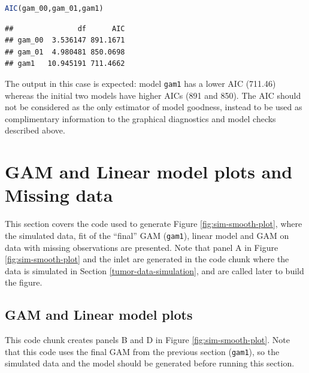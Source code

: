 \documentclass[
]{article}
\newcommand{\passthrough}[1]{#1}
\begin{document}
\begin{lstlisting}[language=R]
AIC(gam_00,gam_01,gam1)
\end{lstlisting}

\begin{lstlisting}
##               df      AIC
## gam_00  3.536147 891.1671
## gam_01  4.980481 850.0698
## gam1   10.945191 711.4662
\end{lstlisting}

The output in this case is expected: model \passthrough{\lstinline!gam1!} has a lower AIC (711.46) whereas the initial two models have higher AICs (891 and 850). The AIC should not be considered as the only estimator of model goodness, instead to be used as complimentary information to the graphical diagnostics and model checks described above.

\hypertarget{gam-and-linear-model-plots-and-missing-data}{%
\section{GAM and Linear model plots and Missing data}\label{gam-and-linear-model-plots-and-missing-data}}

This section covers the code used to generate Figure \ref{fig:sim-smooth-plot}, where the simulated data, fit of the ``final'' GAM (\passthrough{\lstinline!gam1!}), linear model and GAM on data with missing observations are presented. Note that panel A in Figure \ref{fig:sim-smooth-plot} and the inlet are generated in the code chunk where the data is simulated in Section \ref{tumor-data-simulation}, and are called later to build the figure.

\hypertarget{gam-and-linear-model-plots}{%
\subsection{GAM and Linear model plots}\label{gam-and-linear-model-plots}}

This code chunk creates panels B and D in Figure \ref{fig:sim-smooth-plot}. Note that this code uses the final GAM from the previous section (\passthrough{\lstinline!gam1!}), so the simulated data and the model should be generated before running this section.
\end{document}
